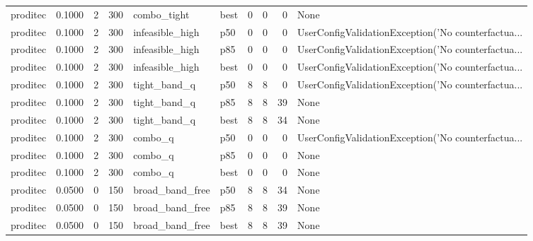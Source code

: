 \begin{tabular}{lrrrllrrrl}
proditec &    0.1000 &    2 &    300 &          combo\_tight &   best &               0 &          0 &       0 &                                               None \\
proditec &    0.1000 &    2 &    300 &      infeasible\_high &    p50 &               0 &          0 &       0 & UserConfigValidationException('No counterfactua... \\
proditec &    0.1000 &    2 &    300 &      infeasible\_high &    p85 &               0 &          0 &       0 & UserConfigValidationException('No counterfactua... \\
proditec &    0.1000 &    2 &    300 &      infeasible\_high &   best &               0 &          0 &       0 & UserConfigValidationException('No counterfactua... \\
proditec &    0.1000 &    2 &    300 &         tight\_band\_q &    p50 &               8 &          8 &       0 & UserConfigValidationException('No counterfactua... \\
proditec &    0.1000 &    2 &    300 &         tight\_band\_q &    p85 &               8 &          8 &      39 &                                               None \\
proditec &    0.1000 &    2 &    300 &         tight\_band\_q &   best &               8 &          8 &      34 &                                               None \\
proditec &    0.1000 &    2 &    300 &              combo\_q &    p50 &               0 &          0 &       0 & UserConfigValidationException('No counterfactua... \\
proditec &    0.1000 &    2 &    300 &              combo\_q &    p85 &               0 &          0 &       0 &                                               None \\
proditec &    0.1000 &    2 &    300 &              combo\_q &   best &               0 &          0 &       0 &                                               None \\
proditec &    0.0500 &    0 &    150 &      broad\_band\_free &    p50 &               8 &          8 &      34 &                                               None \\
proditec &    0.0500 &    0 &    150 &      broad\_band\_free &    p85 &               8 &          8 &      39 &                                               None \\
proditec &    0.0500 &    0 &    150 &      broad\_band\_free &   best &               8 &          8 &      39 &                                               None \\

\end{tabular}
